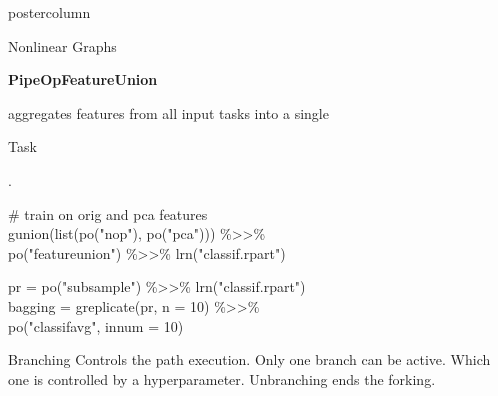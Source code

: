 \documentclass{beamer}
\newcommand{\codeinline}[1]{\begin{codeboxinline}#1\end{codeboxinline}}
\begin{document}
\begin{frame}[fragile]{}
\begin{columns}
\begin{column}{.245\textwidth}
\begin{beamercolorbox}[center]{postercolumn}
\begin{minipage}{.98\textwidth}
{\begin{myblock}{Nonlinear Graphs}
\begin{center}
              \end{center}
              \codeinline{\textbf{PipeOpFeatureUnion}} aggregates features from all input tasks into a single \codeinline{Task}.
              \\
              \begin{codeboxexample}
                {\footnotesize
                \# train on orig and pca features\\
                gunion(list(po("nop"), po("pca"))) \%>{}>\%\\
                po("featureunion")} \%>{}>\% lrn("classif.rpart")\\
              \end{codeboxexample}
              \begin{codeboxexample}
                {\footnotesize
                pr = po("subsample") \%>{}>\% lrn("classif.rpart")\\
                bagging = greplicate(pr, n = 10) \%>{}>\%\\
                \hspace*{1ex} po("classifavg", innum = 10)}
              \end{codeboxexample}
            \end{myblock}
            \vspace{-1.0em}
            \begin{myblock}{Branching}
              Controls the path execution.
              Only one branch can be active.
              Which one is controlled by a hyperparameter.
              Unbranching ends the forking.
              \\
              \begin{codeboxexample}[- Preprocessing]
                {\footnotesize
}
\end{codeboxexample}
\end{myblock}}
\end{minipage}
\end{beamercolorbox}
\end{column}
\end{columns}
\end{frame}
\end{document}
